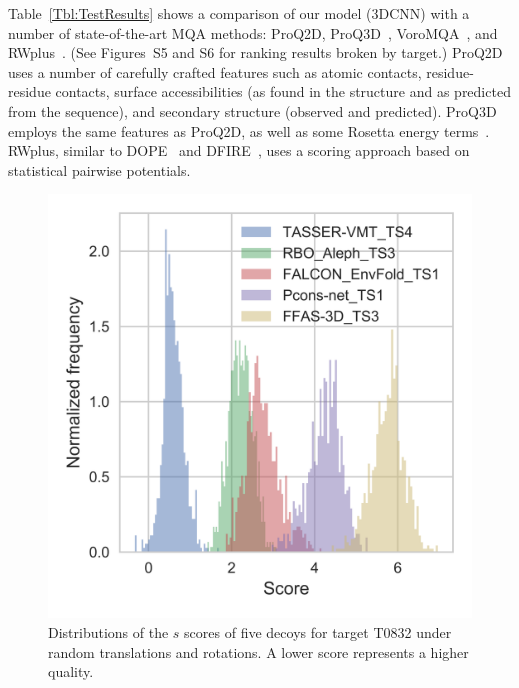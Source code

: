 \documentclass{bioinfo}
\begin{document}
Table~\ref{Tbl:TestResults} shows a comparison of our model (3DCNN)
with a number of state-of-the-art MQA methods: ProQ2D,
ProQ3D~\citep{uziela2017proq3d},
VoroMQA~\citep{olechnovivc2017voromqa}, and
RWplus~\citep{zhang2010novel}.
%
(See Figures~S5 and S6 for ranking results broken by target.)
%
ProQ2D uses a number of carefully crafted features such as atomic
contacts, residue-residue contacts, surface accessibilities (as found
in the structure and as predicted from the sequence), and secondary
structure (observed and predicted). ProQ3D employs the same features
as ProQ2D, as well as some Rosetta energy
terms~\citep{leaverfay2011rosetta}.
%
RWplus, similar to DOPE~\citep{shen2006statistical} and
DFIRE~\citep{zhou2002distance}, uses a scoring approach based on
statistical pairwise potentials.
%
\begin{figure}[t]
    \centerline{\includegraphics[width=0.7\linewidth]{image5}}
    \vspace{-15pt}
    \caption{Distributions of the $s$ scores of five decoys for target
    T0832 under random translations and rotations. A lower score
    represents a higher quality.}
    \label{Fig:DecoysScoreDistribution}
\end{figure}
%
\end{document}

